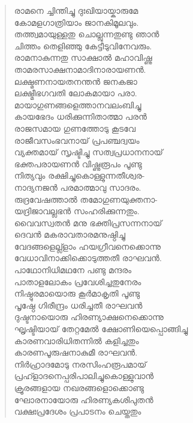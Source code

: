 \begin{verse}
രാമനെ ച്ചിന്തിച്ചു ദുഃഖിയായ്കാരുമേ\\
കോമളഗാത്രിയാം ജാനകിമൂലവും.\\
തത്ത്വമായുള്ളതു ചൊല്ലുന്നതുണ്ടു ഞാന്‍\\
ചിത്തം തെളിഞ്ഞു കേട്ടീടുവിനേവരും.\\
രാമനാകുന്നതു സാക്ഷാല്‍ മഹാവിഷ്ണു\\
താമരസാക്ഷനാമാദിനാരായണന്‍.\\
ലക്ഷ്മണനായതനന്തന്‍ ജനകജാ\\
ലക്ഷ്മീഭഗവതി ലോകമായാ പരാ.\\
മായാഗുണങ്ങളെത്താനവലംബിച്ചു\\
കായഭേദം ധരിക്കുന്നിതാത്മാ പരന്‍\\
രാജസമായ ഗുണത്തോടു കൂടവേ\\
രാജീവസംഭവനായ് പ്രപഞ്ചദ്വയം\\
വ്യക്തമായ് സൃഷ്ടിച്ചു സത്വപ്രധാനനായ്\\
ഭക്തപരായണന്‍ വിഷ്ണുരൂപം പൂണ്ടു\\
നിത്യവും രക്ഷിച്ചുകൊള്ളുന്നതീശ്വര-\\
നാദ്യനജന്‍ പരമാത്മാവു സാദരം.\\
രുദ്രവേഷത്താല്‍ തമോഗുണയുക്തനാ-\\
യദ്രിജാവല്ലഭന്‍ സംഹരിക്കുന്നതും.\\
വൈവസ്വതന്‍ മനു ഭക്തിപ്രസന്നനായ്\\
ദെവന്‍ മകരാവതാരമനുഷ്ഠിച്ചു\\
വേദങ്ങളെല്ല്ളാം ഹയഗ്രീവനെക്കൊന്നു\\
വേധാവിനാക്കിക്കൊടുത്തതീ രാഘവന്‍.\\
പാഥോനിധിമഥനേ പണ്ടു മന്ദരം\\
പാതാളലോകം പ്രവേശിച്ചതുനേരം\\
നിഷ്ഠുരമായൊരു കൂര്‍മാകൃതി പൂണ്ടു\\
പൃഷ്ഠേ ഗിരീന്ദ്രം ധരിച്ചതീ രാഘവന്‍\\
ദുഷ്ടനായൊരു ഹിരണ്യാക്ഷനെക്കൊന്നു\\
ഘൃഷ്ടിയായ് തേറ്റമേല്‍ ക്ഷോണിയെപ്പൊങ്ങിച്ചു\\
കാരണവാരിധിതന്നില്‍ കളിച്ചതും\\
കാരണപൂരുഷനാകുമീ രാഘവന്‍.\\
നിര്‍ഹ്രാദമോടു നരസിംഹരൂപമായ്\\
പ്രഹ്ളാദനെപ്പരിപാലിച്ചുകൊള്ളുവാന്‍\\
ക്രൂരങ്ങളായ നഖരങ്ങളൊക്കൊണ്ടു\\
ഘോരനായോരു ഹിരണ്യകശിപുതന്‍\\
വക്ഷഃപ്രദേശം പ്രപാടനം ചെയ്തതും\\

\end{verse}
